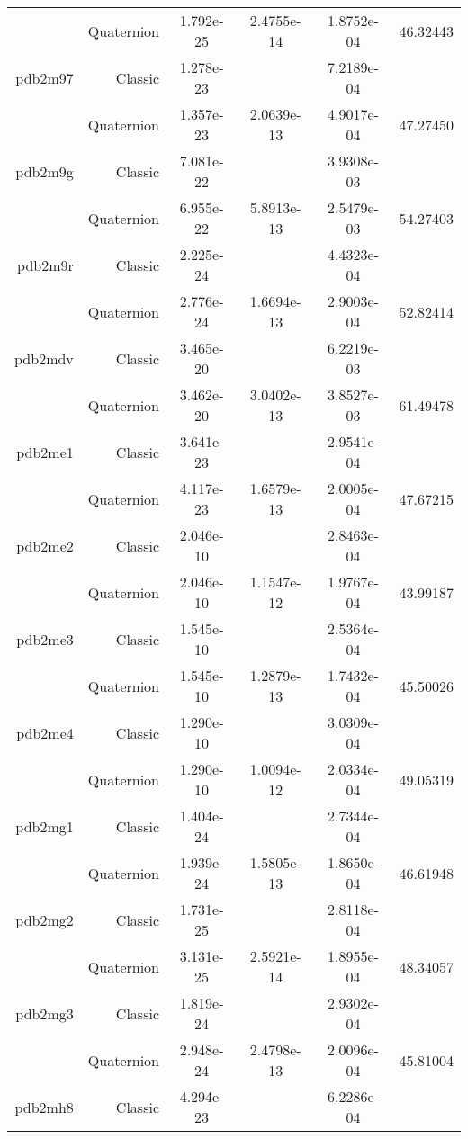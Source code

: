 \begin{xltabular}{\textwidth}{r|rS[table-format=1.3e+2]S[table-format=1.4e+2]S[table-format=1.4e+2]S[table-format=-1.5]}
& Quaternion & 1.792e-25 & 2.4755e-14 & 1.8752e-04 & 46.32443\\  \addlinespace
pdb2m97 & Classic & 1.278e-23 &  & 7.2189e-04 & \\
& Quaternion & 1.357e-23 & 2.0639e-13 & 4.9017e-04 & 47.27450\\  \addlinespace
pdb2m9g & Classic & 7.081e-22 &  & 3.9308e-03 & \\
& Quaternion & 6.955e-22 & 5.8913e-13 & 2.5479e-03 & 54.27403\\  \addlinespace
pdb2m9r & Classic & 2.225e-24 &  & 4.4323e-04 & \\
& Quaternion & 2.776e-24 & 1.6694e-13 & 2.9003e-04 & 52.82414\\  \addlinespace
pdb2mdv & Classic & 3.465e-20 &  & 6.2219e-03 & \\
& Quaternion & 3.462e-20 & 3.0402e-13 & 3.8527e-03 & 61.49478\\  \addlinespace
pdb2me1 & Classic & 3.641e-23 &  & 2.9541e-04 & \\
& Quaternion & 4.117e-23 & 1.6579e-13 & 2.0005e-04 & 47.67215\\  \addlinespace
pdb2me2 & Classic & 2.046e-10 &  & 2.8463e-04 & \\
& Quaternion & 2.046e-10 & 1.1547e-12 & 1.9767e-04 & 43.99187\\  \addlinespace
pdb2me3 & Classic & 1.545e-10 &  & 2.5364e-04 & \\
& Quaternion & 1.545e-10 & 1.2879e-13 & 1.7432e-04 & 45.50026\\  \addlinespace
pdb2me4 & Classic & 1.290e-10 &  & 3.0309e-04 & \\
& Quaternion & 1.290e-10 & 1.0094e-12 & 2.0334e-04 & 49.05319\\  \addlinespace
pdb2mg1 & Classic & 1.404e-24 &  & 2.7344e-04 & \\
& Quaternion & 1.939e-24 & 1.5805e-13 & 1.8650e-04 & 46.61948\\  \addlinespace
pdb2mg2 & Classic & 1.731e-25 &  & 2.8118e-04 & \\
& Quaternion & 3.131e-25 & 2.5921e-14 & 1.8955e-04 & 48.34057\\  \addlinespace
pdb2mg3 & Classic & 1.819e-24 &  & 2.9302e-04 & \\
& Quaternion & 2.948e-24 & 2.4798e-13 & 2.0096e-04 & 45.81004\\  \addlinespace
pdb2mh8 & Classic & 4.294e-23 &  & 6.2286e-04 & \\

\end{xltabular}

